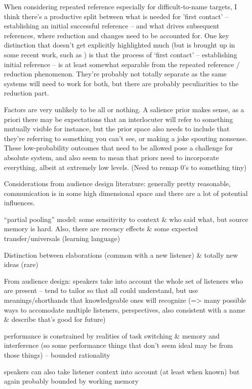 \documentclass[]{article}
\begin{document}
When considering repeated reference especially for difficult-to-name targets, I think there's a productive split between what is needed for 'first contact' -- establishing an initial successful reference -- and what drives subsequent references, where reduction and changes need to be accounted for. One key distinction that doesn't get explicitly highlighted much (but is brought up in some recent work, such as \cite{leung2023}) is that the process of `first contact' -- establishing initial reference -- is at least somewhat separable from the repeated reference / reduction phenomenon. They're probably not totally separate as the same systems will need to work for both, but there are probably peculiarities to the reduction part. 

Factors are very unlikely to be all or nothing. A salience prior makes sense, as a priori there may be expectations that an interlocuter will refer to something mutually visible for instance, but the prior space also needs to include that they're referring to something you can't see, or making a joke spouting nonsense. These low-probability outcomes that need to be allowed pose a challenge for absolute system, and also seem to mean that priors need to incorporate everything, albeit at extremely low levels. (Need to remap 0's to something tiny) 

Considerations from audience design literature: generally pretty reasonable, communication is in some high dimensional space and there are a lot of potential influences. 

``partial pooling'' model: some sensitivity to context \& who said what, but source memory is hard. Also, there are recency effects \& some expected transfer/universals (learning language) 

Distinction between elaborations (common with a new listener) \& totally new ideas (rare)

From audience design: speakers take into account the whole set of listeners who are present -- tend to tailor so that all could understand, but use meanings/shorthands that knowledgeable ones will recognize (=> many possible ways to accomodate multiple listeners, perspectives, also consistent with a name \& describe that's good for future) 

performance is constrained by realities of task switching \& memory and interference (so some performance things that don't seem ideal may be from those things) -- bounded rationality 

speakers can also take listener context into account (at least when known) but again probably bounded by working memory
\end{document}
